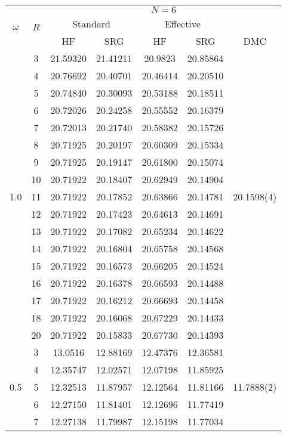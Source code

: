 \begin{table}[h!]
\begin{center}
\tabcolsep=0.35cm
\begin{tabular}{|c|c|c|c|c|c|c|}
\hline
\multirow{3}{*}{$\omega$} & \multirow{3}{*}{$R$} & \multicolumn{5}{|c|}{$N=6$} \\
& & \multicolumn{2}{|c|}{Standard} & \multicolumn{2}{|c|}{Effective} &  \\
& & HF & SRG & HF & SRG & DMC \\
\hline\hline
\multirow{17}{*}{1.0} & 3&21.59320 &21.41211 &20.9823 &20.85864 & \multirow{17}{*}{20.1598(4)} \\ %
& 4&20.76692 &20.40701 &20.46414 &20.20510 & \\
& 5& 20.74840 &20.30093 &20.53188 &20.18511 & \\
& 6&20.72026 &20.24258 &20.55552 &20.16379 & \\
& 7&20.72013 &20.21740 &20.58382 &20.15726 & \\
& 8&20.71925 &20.20197 &20.60309 &20.15334 & \\
& 9&20.71925 &20.19147 &20.61800 &20.15074 & \\
& 10&20.71922 &20.18407 &20.62949 &20.14904 & \\
& 11&20.71922 &20.17852 &20.63866 &20.14781 & \\
& 12&20.71922 &20.17423 &20.64613 & 20.14691 & \\
& 13&20.71922 &20.17082 &20.65234 &20.14622  & \\
& 14&20.71922 &20.16804  &20.65758& 20.14568& \\
& 15& 20.71922 &20.16573  &20.66205 &20.14524 &  \\
& 16&20.71922 &20.16378 & 20.66593 &20.14488 & \\
& 17&20.71922 &20.16212 & 20.66693 & 20.14458& \\ 
& 18& 20.71922 &20.16068 &20.67229 & 20.14433 & \\
& 20 &20.71922 &20.15833 &20.67730 & 20.14393& \\
\hline
\multirow{15}{*}{0.5} & 3&13.0516 &12.88169 &12.47376 &12.36581 & \multirow{15}{*}{11.7888(2)} \\ 
& 4&12.35747 &12.02571 &12.07198 &11.85925 & \\
& 5&12.32513 &11.87957 &12.12564 &11.81166 & \\
& 6&12.27150 &11.81401 &12.12696 &11.77419 & \\
& 7&12.27138 &11.79987 &12.15198 &11.77034 & \\

\end{tabular}
\end{center}
\end{table}
